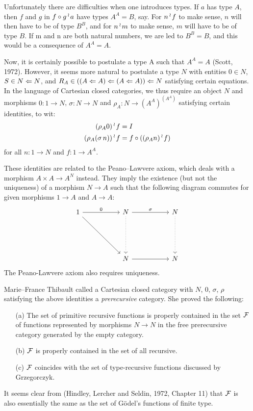 Unfortunately there are difficulties when one introduces
types. If $a$ has type $A$, then $f$ and $g$ in $f\circ g \mathop{{}^\wr}\kern-.8pt a$ have types $A^A=B$, say.
For $n\mathop{{}^\wr}\kern-.8pt f$ to make sense, $n$ will then have to be of type $B^B$, and for $n\mathop{{}^\wr}\kern-.8pt m$ to make sense,
$m$ will have to be of type $B$. If m and n are both natural numbers, we
are led to $B^B = B$, and this would be a consequence of $A^A = A$.

Now, it is certainly possible to postulate a type A such
that $A^A = A$ (Scott, 1972). However, it seems more natural to postulate a type $N$
with entities $0 \in N$, $S \in N \Leftarrow N$, and $R_A \in ((A \Leftarrow A) \Leftarrow (A \Leftarrow A)) \Leftarrow N$
satisfying certain equations. In the language of Cartesian closed categories, we thus require an object
$N$ and morphisms $0: 1 \to N$, $\sigma: N\to N$ and $\rho_A: N \to (A^A)^{(A^A)}$
satisfying certain identities, to wit:
\begin{align*}
(\rho_A 0)\mathop{{}^\wr}\kern-.8pt f &= I\\
(\rho_A (\sigma\, n))\mathop{{}^\wr}\kern-.8pt f &= f\circ((\rho_A n)\mathop{{}^\wr}\kern-.8pt f)
\end{align*}
for all $n:1 \to N$ and $f:1 \to A^A$. 

These identities are related to the Peano--Lawvere axiom,
which deals with a morphism $A \times A \to A^N$ instead.
They imply the existence (but not the uniqueness) of a morphism
$N\to A$ such that the following diagram commutes for given morphisms $1 \to A$ and $A \to A$:
\[
\begin{tikzcd}[row sep=.75in, column sep = .75in]
    1 \arrow[rd] \arrow{r}{0} &N \arrow[dotted]{d}{} \arrow{r}{\sigma}  & N \arrow[dotted]{d}{} \\
    {} & N  \arrow{r}{} & N
\end{tikzcd}
\]
The Peano-Lawvere axiom also requires uniqueness.

Marie--France Thibault called a Cartesian closed category with
$N$, $0$, $\sigma$, $\rho$ satisfying the above identities a {\it prerecursive} category. She proved the following:
\begin{enumerate}
\item[(a)] The set of primitive recursive functions is properly contained in the set $\cal F$
of functions represented by morphisms $N \to N$ in the free prerecursive category
generated by the empty category.
\item[(b)] $\cal F$ is properly contained in the set of all recursive.
\item[(c)] $\cal F$ coincides with the set of type-recursive functions
discussed by Grzegorczyk.
\end{enumerate}
It seems clear from (Hindley, Lercher and Seldin, 1972, Chapter
11) that $\cal F$ is also essentially the same as the set of G\"odel's functions of finite type.

